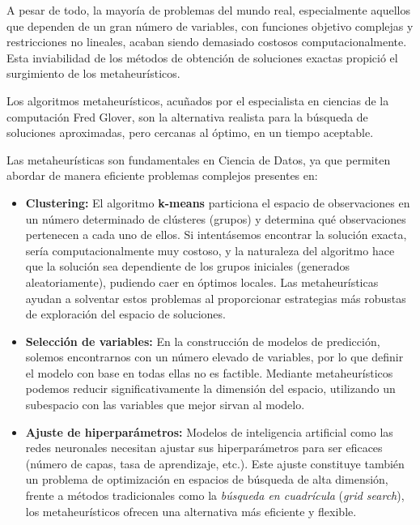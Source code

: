 \documentclass[12pt,a4paper]{book}
\begin{document}
A pesar de todo, la mayoría de problemas del mundo real, especialmente aquellos que dependen de un gran número de variables, con funciones objetivo complejas y restricciones no lineales, acaban siendo demasiado costosos computacionalmente. Esta inviabilidad de los métodos de obtención de soluciones exactas propició el surgimiento de los metaheurísticos.

Los algoritmos metaheurísticos\cite{metaheuristicos}, acuñados por el especialista en ciencias de la computación Fred Glover,
son la alternativa realista para la búsqueda de soluciones aproximadas, pero cercanas al óptimo, en un tiempo aceptable.

Las metaheurísticas son fundamentales en Ciencia de Datos, ya que permiten abordar de manera eficiente problemas complejos presentes en:

\begin{itemize}
    \item \textbf{Clustering:} El algoritmo \textbf{k-means} particiona el espacio de observaciones en un número determinado de clústeres (grupos) y determina qué observaciones pertenecen a cada uno de ellos. 
    Si intentásemos encontrar la solución exacta, sería computacionalmente muy costoso, y la naturaleza del algoritmo hace que la solución sea dependiente de los grupos iniciales (generados aleatoriamente), pudiendo caer en óptimos locales.
    Las metaheurísticas ayudan a solventar estos problemas al proporcionar estrategias más robustas de exploración del espacio de soluciones.
    
    \item \textbf{Selección de variables:} En la construcción de modelos de predicción, solemos encontrarnos con un número elevado de variables, por lo que definir el modelo con base en todas ellas no es factible. Mediante metaheurísticos podemos 
    reducir significativamente la dimensión del espacio, utilizando un subespacio con las variables que mejor sirvan al modelo.
    
    \item \textbf{Ajuste de hiperparámetros:} Modelos de inteligencia artificial como las redes neuronales necesitan ajustar sus hiperparámetros para ser eficaces (número de capas, tasa de aprendizaje, etc.). Este ajuste constituye también un problema de optimización en espacios de búsqueda de alta dimensión, frente a métodos tradicionales como la \textit{búsqueda en cuadrícula} (\textit{grid search}), los metaheurísticos ofrecen una alternativa más eficiente y flexible.
\end{itemize}
\end{document}
